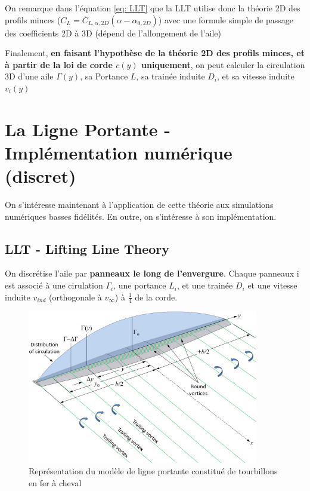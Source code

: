 On remarque dans l'équation \ref{eq: LLT} que la LLT utilise donc la théorie 2D des profils minces ($C_L = C_{L, \alpha, 2D}(\alpha - \alpha_{0,2D})$) avec une formule simple de passage des coefficients 2D à 3D (dépend de l'allongement de l'aile)

Finalement, \textbf{en faisant l'hypothèse de la théorie 2D des profils minces, et à partir de la loi de corde $c(y)$ uniquement}, on peut calculer la circulation 3D d'une aile $\Gamma(y)$, sa Portance $L$, sa trainée induite $D_i$, et sa vitesse induite $v_i(y)$

\section{La Ligne Portante - Implémentation numérique (discret)} 
\label{sec:Ch1.2}

On s'intéresse maintenant à l'application de cette théorie aux simulations numériques basses fidélités. En outre, on s'intéresse à son implémentation. 

\subsection{LLT - Lifting Line Theory} 
\label{subsec:Ch1.2.1}

On discrétise l'aile par \textbf{panneaux le long de l'envergure}. Chaque panneaux i est associé à une cirulation $\Gamma_i$, une portance $L_i$, et une trainée $D_i$ et une vitesse induite $v_{ind}$ (orthogonale à $v_{\infty}$) à $\frac{1}{4}$ de la corde.

\begin{figure}[H]
    \centering
    \includegraphics[width=0.9\textwidth]{Pics/01 - Basses Fidélités/LLT schéma.jpg}
    \caption{Représentation du modèle de ligne portante constitué de tourbillons en fer à cheval}
    \label{fig: vortex vsm}
\end{figure}

